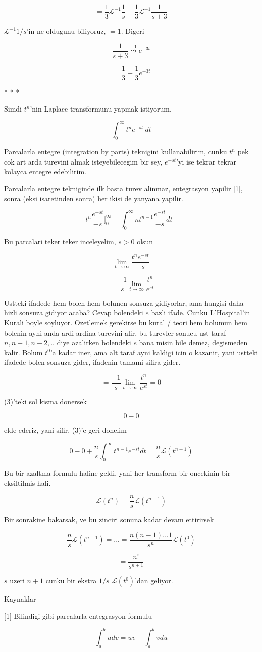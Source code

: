 \documentclass[12pt,fleqn]{article}
\begin{document}
\[ = \frac{1}{3} \mathcal{L}^{-1}\frac{1}{s}  - 
\frac{1}{3} \mathcal{L}^{-1}\frac{1}{s+3}  
\]

$\mathcal{L}^{-1}1/s$'in ne oldugunu biliyoruz, $=1$. Digeri

\[ \frac{1}{s+3} \stackrel{-1}{\leadsto} e^{-3t} \]

\[ =  
\frac{1}{3} - \frac{1}{3} e^{-3t}
\]

* * * 

Simdi $t^n$'nin Laplace transformunu yapmak istiyorum. 

\[ \int_0^{\infty} t^ne^{-st} \ dt \]

Parcalarla entegre (integration by parts) teknigini kullanabilirim, cunku
$t^n$ pek cok art arda turevini almak isteyebilecegim bir sey, $e^{-st}$'yi
ise tekrar tekrar kolayca entegre edebilirim. 

Parcalarla entegre tekniginde ilk basta turev alinmaz, entegrasyon yapilir [1],
sonra (eksi isaretinden sonra) her ikisi de yanyana yapilir. 

\[ t^n \frac{e^{-st}}{-s} \bigg]_{0}^{\infty}  - 
\int_{0}^{\infty} nt^{n-1} \frac{e^{-st}}{-s} dt
\ \ \ \label{3}
\] 

Bu parcalari teker teker inceleyelim, $s>0$ olsun

\[ \lim_{t \to \infty} \frac{t^n  e^{-st}}{-s}\] 

\[ = \frac{-1}{s}\lim_{t \to \infty} \frac{t^n}{ e^{st}}\] 

Ustteki ifadede hem bolen hem bolunen sonsuza gidiyorlar, ama hangisi daha
hizli sonsuza gidiyor acaba? Cevap bolendeki $e$ bazli ifade. Cunku
L'Hospital'in Kurali boyle soyluyor. Ozetlemek gerekirse bu kural / teori
hem bolumun hem bolenin ayni anda ardi ardina turevini alir, bu turevler
sonucu ust taraf $n,n-1,n-2,..$ diye azalirken bolendeki $e$ bana misin
bile demez, degismeden kalir. Bolum $t^0$'a kadar iner, ama alt taraf ayni
kaldigi icin o kazanir, yani ustteki ifadede bolen sonsuza gider, ifadenin
tamami sifira gider. 

\[ = \frac{-1}{s}\lim_{t \to \infty} \frac{t^n}{ e^{st}} = 0\] 

(3)'teki sol kisma donersek 

\[ 0 - 0  \]

elde ederiz, yani sifir. (3)'e geri donelim

\[ 0 - 0   +
\frac{n}{s} \int_{0}^{\infty} t^{n-1} e^{-st} dt = 
\frac{n}{s} \mathcal{L} (t^{n-1})
\]

Bu bir azaltma formulu haline geldi, yani her transform bir oncekinin bir
eksiltilmis hali. 

\[ \mathcal{L} (t^n) = \frac{n}{s} \mathcal{L} (t^{n-1}) 
 \]

Bir sonrakine bakarsak, ve bu zinciri sonuna kadar devam ettirirsek

\[ \frac{n}{s} \mathcal{L} (t^{n-1}) = ... = 
\frac{n(n-1)...1 }{s^n}\mathcal{L}(t^0)
 \]

\[ = \frac{n!}{s^{n+1}} \]

$s$ uzeri $n+1$ cunku bir ekstra $1/s$ $\mathcal{L} (t^0)$'dan geliyor. 

Kaynaklar

[1] Bilindigi gibi parcalarla entegrasyon formulu

\[ \int_a^b u dv = 
uv - \int_a^b v du
 \]
\end{document}

